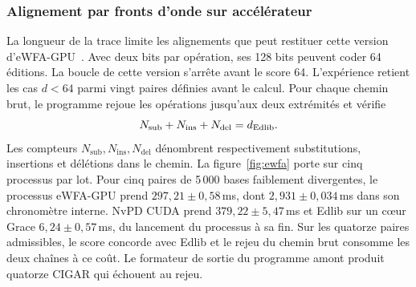 \subsubsection{Alignement par fronts d’onde sur accélérateur}
La longueur de la trace limite les alignements que peut restituer cette version d’eWFA-GPU~\cite{wfagpu,ewfacode}. Avec deux bits par opération, ses 128 bits peuvent coder 64 éditions. La boucle de cette version s'arrête avant le score 64. L'expérience retient les cas \(d<64\) parmi vingt paires définies avant le calcul. Pour chaque chemin brut, le programme rejoue les opérations jusqu'aux deux extrémités et vérifie
\[
 N_{\mathrm{sub}}+N_{\mathrm{ins}}+N_{\mathrm{del}}=d_{\rm Edlib}.
\]
Les compteurs \(N_{\mathrm{sub}},N_{\mathrm{ins}},N_{\mathrm{del}}\) dénombrent respectivement substitutions, insertions et délétions dans le chemin.
La figure~\ref{fig:ewfa} porte sur cinq processus par lot. Pour cinq paires de 5\,000 bases faiblement divergentes, le processus eWFA-GPU prend \(297{,}21\pm0{,}58\)\,ms, dont \(2{,}931\pm0{,}034\)\,ms dans son chronomètre interne. NvPD CUDA prend \(379{,}22\pm5{,}47\)\,ms et Edlib sur un cœur Grace \(6{,}24\pm0{,}57\)\,ms, du lancement du processus à sa fin. Sur les quatorze paires admissibles, le score concorde avec Edlib et le rejeu du chemin brut consomme les deux chaînes à ce coût. Le formateur de sortie du programme amont produit quatorze CIGAR qui échouent au rejeu.

